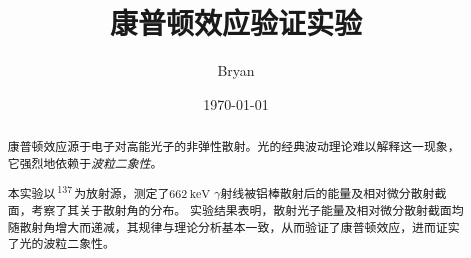 \documentclass[aps,pre,12pt,preprint,%
	onecolumn,showpacs,showkeys,nofootinbib]{revtex4-1}
\newcommand{\CsAtom}{\,\textsuperscript{137}\tup{Cs}\,}
\begin{document}
	\title{%
	\texstringonly{\hfil\\[2\baselineskip]}
	\sf\LARGE%
		康普顿效应验证实验%
	\texstringonly{\vspace{3ex}}}
	\author{\fangsong\large%
		Bryan%
	\vspace{2mm}}
	\date{\today}

\begin{abstract}
\vspace{10mm}
\begin{spacing}{1.5}\normalsize
\setlength{\parskip}{.3\baselineskip}
	康普顿效应源于电子对高能光子的非弹性散射。光的经典波动理论难以解释这一现象，它强烈地依赖于\textit{波粒二象性}。
	
	本实验以\CsAtom 为放射源，测定了$\SI{662}{\keV}$ $\gamma$射线被铝棒散射后的能量及相对微分散射截面，考察了其关于散射角的分布。
	实验结果表明，散射光子能量及相对微分散射截面均随散射角增大而递减，其规律与理论分析基本一致，从而验证了康普顿效应，进而证实了光的波粒二象性。
\end{spacing}
\end{abstract}

\maketitle
\thispagestyle{titlepagestyle}

\end{document}
